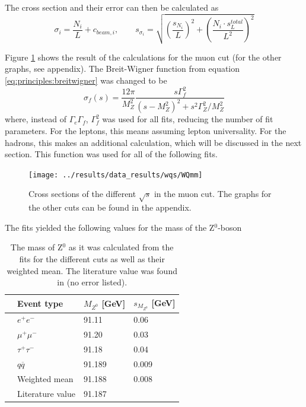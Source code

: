 The cross section and their error can then be calculated as
\begin{equation}
\sigma_i=\frac{N_i}{L}+c_{beam,i}, \qquad s_{\sigma_i}=\sqrt{(\frac{s_{N_i}}{L})^2+(\frac{N_i\cdot s_L^{total}}{L^2})^2}
\end{equation}

Figure \ref{fig:WQmm} shows the result of the calculations for the muon cut (for the other graphs, see appendix). The Breit-Wigner function from equation \ref{eq:principles:breitwigner} was changed to be
\begin{equation}
\sigma_f(s) = \frac{12\pi}{M_Z^2} \frac{s\Gamma_f^2}{(s-M_Z^2)^2+s^2\Gamma_Z^2/M_Z^2}
\end{equation}
where, instead of $\Gamma_e\Gamma_f$, $\Gamma_f^2$ was used for all fits, reducing the number of fit parameters. For the leptons, this means assuming lepton universality. For the hadrons, this makes an additional calculation, which will be discussed in the next section. This function was used for all of the following fits.

\begin{figure}
\centering
\texttt{[image: ../results/data\_results/wqs/WQmm]}
\caption[Cross sections for muon cut]{Cross sections of the different $\sqrt{s}$ in the muon cut. The graphs for the other cuts can be found in the appendix.}
\label{fig:WQmm}
\end{figure}

The fits yielded the following values for the mass of the Z$^0$-boson
\begin{table}[H]\centering
	\begin{tabular}{@{}llll@{}}
		\toprule
		&Event type&$M_{Z^0}$ [GeV]&$s_{M_{Z^0}}$ [GeV]\\
		\midrule
		&$e^+e^-$&91.11&0.06\\
		&$\mu^+\mu^-$&91.20&0.03\\
		&$\tau^+\tau^-$&91.18&0.04\\
		&$q\overline{q}$&91.189&0.009\\
		\midrule
		&Weighted mean&91.188&0.008\\
		&Literature value&91.187&\\
		\bottomrule
	\end{tabular}
	\caption[Breit-Wigner fit results: $M_{Z^0}$]{The mass of Z$^0$ as it was calculated from the fits for the different cuts as well as their weighted mean. The literature value was found in \cite{muenchen} (no error listed).}
	\label{tb:Z0massfitresults}
\end{table}

